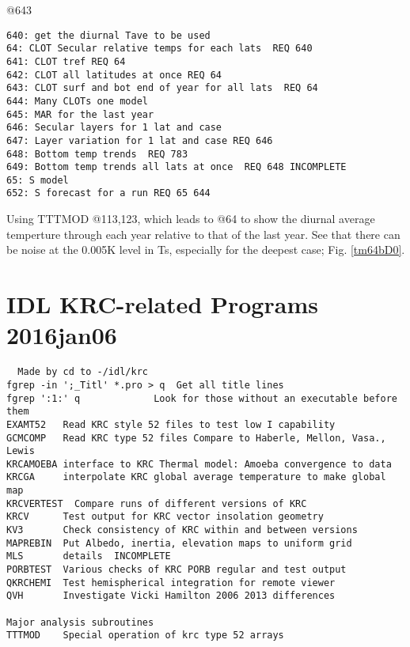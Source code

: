 \documentclass{article}
\begin{document}
@643 
\vspace{-3.mm} 
\begin{verbatim}
640: get the diurnal Tave to be used 
64: CLOT Secular relative temps for each lats  REQ 640
641: CLOT tref REQ 64
642: CLOT all latitudes at once REQ 64
643: CLOT surf and bot end of year for all lats  REQ 64
644: Many CLOTs one model
645: MAR for the last year
646: Secular layers for 1 lat and case
647: Layer variation for 1 lat and case REQ 646
648: Bottom temp trends  REQ 783
649: Bottom temp trends all lats at once  REQ 648 INCOMPLETE
65: S model
652: S forecast for a run REQ 65 644
\end{verbatim}


Using TTTMOD @113,123, which leads to @64 to show the diurnal average temperture
through each year relative to that of the last year.  See that there can be
noise at the 0.005K level in Ts, especially for the deepest case;
Fig. \ref{tm64bD0}.

\section{IDL KRC-related Programs 2016jan06}
\vspace{-3.mm} 
\begin{verbatim}
  Made by cd to -/idl/krc  
fgrep -in ';_Titl' *.pro > q  Get all title lines
fgrep ':1:' q             Look for those without an executable before them
EXAMT52   Read KRC style 52 files to test low I capability
GCMCOMP   Read KRC type 52 files Compare to Haberle, Mellon, Vasa., Lewis
KRCAMOEBA interface to KRC Thermal model: Amoeba convergence to data
KRCGA     interpolate KRC global average temperature to make global map
KRCVERTEST  Compare runs of different versions of KRC
KRCV      Test output for KRC vector insolation geometry
KV3       Check consistency of KRC within and between versions
MAPREBIN  Put Albedo, inertia, elevation maps to uniform grid
MLS       details  INCOMPLETE
PORBTEST  Various checks of KRC PORB regular and test output
QKRCHEMI  Test hemispherical integration for remote viewer
QVH       Investigate Vicki Hamilton 2006 2013 differences

Major analysis subroutines
TTTMOD    Special operation of krc type 52 arrays
\end{verbatim} 
\end{document}
